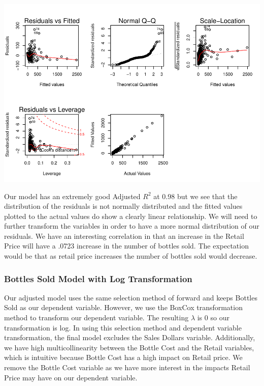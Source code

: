 \documentclass[]{elsarticle} %
\makeatletter
\def\maxwidth{\ifdim\Gin@nat@width>\linewidth\linewidth
\else\Gin@nat@width\fi}
\let\Oldincludegraphics\includegraphics
\renewcommand{\includegraphics}[1]{\Oldincludegraphics[width=\maxwidth]{#1}}
\makeatother
\begin{document}
\includegraphics{Final_Project_files/figure-latex/unnamed-chunk-13-1.pdf}

Our model has an extremely good Adjusted \(R^2\) at 0.98 but we see that
the distribution of the residuals is not normally distributed and the
fitted values plotted to the actual values do show a clearly linear
relationship. We will need to further transform the variables in order
to have a more normal distribution of our residuals. We have an
interesting correlation in that an increase in the Retail Price will
have a .0723 increase in the number of bottles sold. The expectation
would be that as retail price increases the number of bottles sold would
decrease.

\subsubsection{Bottles Sold Model with Log
Transformation}\label{bottles-sold-model-with-log-transformation}

Our adjusted model uses the same selection method of forward and keeps
Bottles Sold as our dependent variable. However, we use the BoxCox
transformation method to transform our dependent variable. The resulting
\(\lambda\) is 0 so our transformation is log. In using this selection
method and dependent variable transformation, the final model excludes
the Sales Dollars variable. Additionally, we have high multicollinearity
between the Bottle Cost and the Retail variables, which is intuitive
because Bottle Cost has a high impact on Retail price. We remove the
Bottle Cost variable as we have more interest in the impacts Retail
Price may have on our dependent variable.
\end{document}
